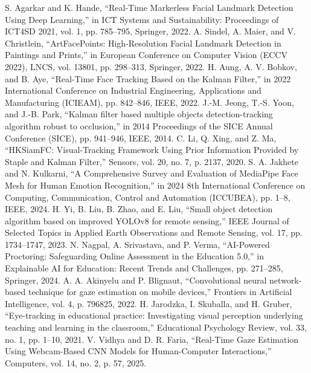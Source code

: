 \documentclass[conference]{IEEEtran}
\begin{document}
\begin{thebibliography}{23}
 S. Agarkar and K. Hande, ``Real-Time Markerless Facial Landmark Detection Using Deep Learning,'' in ICT Systems and Sustainability: Proceedings of ICT4SD 2021, vol. 1, pp. 785--795, Springer, 2022.
 A. Sindel, A. Maier, and V. Christlein, ``ArtFacePoints: High-Resolution Facial Landmark Detection in Paintings and Prints,'' in European Conference on Computer Vision (ECCV 2022), LNCS, vol. 13801, pp. 298--313, Springer, 2022.
 H. Aung, A. V. Bobkov, and B. Aye, ``Real-Time Face Tracking Based on the Kalman Filter,'' in 2022 International Conference on Industrial Engineering, Applications and Manufacturing (ICIEAM), pp. 842--846, IEEE, 2022.
 J.-M. Jeong, T.-S. Yoon, and J.-B. Park, ``Kalman filter based multiple objects detection-tracking algorithm robust to occlusion,'' in 2014 Proceedings of the SICE Annual Conference (SICE), pp. 941--946, IEEE, 2014.
 C. Li, Q. Xing, and Z. Ma, ``HKSiamFC: Visual-Tracking Framework Using Prior Information Provided by Staple and Kalman Filter,'' Sensors, vol. 20, no. 7, p. 2137, 2020.
 S. A. Jakhete and N. Kulkarni, ``A Comprehensive Survey and Evaluation of MediaPipe Face Mesh for Human Emotion Recognition,'' in 2024 8th International Conference on Computing, Communication, Control and Automation (ICCUBEA), pp. 1--8, IEEE, 2024.
 H. Yi, B. Liu, B. Zhao, and E. Liu, ``Small object detection algorithm based on improved YOLOv8 for remote sensing,'' IEEE Journal of Selected Topics in Applied Earth Observations and Remote Sensing, vol. 17, pp. 1734--1747, 2023.
 N. Nagpal, A. Srivastava, and P. Verma, ``AI-Powered Proctoring: Safeguarding Online Assessment in the Education 5.0,'' in Explainable AI for Education: Recent Trends and Challenges, pp. 271--285, Springer, 2024.
 A. A. Akinyelu and P. Blignaut, ``Convolutional neural network-based technique for gaze estimation on mobile devices,'' Frontiers in Artificial Intelligence, vol. 4, p. 796825, 2022.
 H. Jarodzka, I. Skuballa, and H. Gruber, ``Eye-tracking in educational practice: Investigating visual perception underlying teaching and learning in the classroom,'' Educational Psychology Review, vol. 33, no. 1, pp. 1--10, 2021.
 V. Vidhya and D. R. Faria, ``Real-Time Gaze Estimation Using Webcam-Based CNN Models for Human-Computer Interactions,'' Computers, vol. 14, no. 2, p. 57, 2025.
\end{thebibliography}
\end{document}
